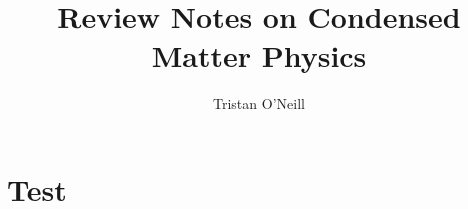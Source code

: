\documentclass[10pt]{article}
\title{Review Notes on Condensed Matter Physics}
\author{Tristan O'Neill}
\begin{document}
\maketitle
\section{Test}
\end{document}
